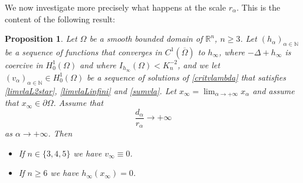 \documentclass[10pt]{amsart}
\numberwithin{equation}{section}
\newcommand{\Om}{\Omega}
\def \rr {\mathbb{R}}
\def \va{v_{\alpha}}
\def \ha{h_{\alpha}}
\def \hi{h_{\infty}}
\def \nn{\mathbb{N}}
\theoremstyle{plain}
\newtheorem{prop}{Proposition}[section]%
\theoremstyle{remark}
\begin{document}
We now investigate more precisely what happens at the scale $r_\alpha$. This is the content of the following result: 
\begin{prop} \label{prop:blowup:bord2}
Let $\Om$ be a smooth bounded domain of $\rr^n$, $n\geq 3$. Let $(\ha)_{\alpha\in\nn}$ be a sequence of functions that converges in $C^{1}(\overline{\Om})$ to $\hi$, where $-\Delta+\hi$ is coercive in $H^1_0(\Om)$ and where $I_{\hi}(\Om)<K_{n}^{-2}$, and we let $(\va)_{\alpha\in\nn}\in H_0^1(\Om)$ be a sequence of solutions of \eqref{critvlambda} that satisfies \eqref{limvlaL2star}, \eqref{limvlaLinfini} and \eqref{sumvla}. Let $x_\infty = \lim_{\alpha \to + \infty} x_\alpha$ and assume that $x_\infty \in \partial \Om$. Assume that 
$$ \frac{d_{\alpha}}{r_\alpha}  \to + \infty  $$
as $\alpha \to + \infty$. Then 
\begin{itemize}
\item If $n \in \{3,4,5\}$ we have $v_\infty \equiv 0$.
\item If $n \ge6$ we have $h_\infty(x_\infty)= 0$. 
	\end{itemize}
\end{prop}
\end{document}
